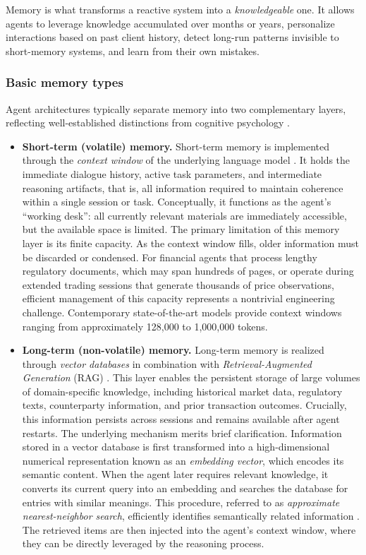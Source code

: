 \documentclass{article}
\begin{document}
Memory is what transforms a reactive system into a \textit{knowledgeable} one. It allows agents to leverage knowledge accumulated over months or years, personalize interactions based on past client history, detect long-run patterns invisible to short-memory systems, and learn from their own mistakes.

\subsubsection{Basic memory types}
Agent architectures typically separate memory into two complementary layers, reflecting well-established distinctions from cognitive psychology \cite{baddeley2025working}.

\begin{itemize}
    \item \textbf{Short-term (volatile) memory.}  Short-term memory is implemented through the \textit{context window} of the underlying language model \cite{brown2020language}. It holds the immediate dialogue history, active task parameters, and intermediate reasoning artifacts, that is, all information required to maintain coherence within a single session or task. Conceptually, it functions as the agent’s ``working desk'': all currently relevant materials are immediately accessible, but the available space is limited. The primary limitation of this memory layer is its finite capacity. As the context window fills, older information must be discarded or condensed. For financial agents that process lengthy regulatory documents, which may span hundreds of pages, or operate during extended trading sessions that generate thousands of price observations, efficient management of this capacity represents a nontrivial engineering challenge. Contemporary state-of-the-art models provide context windows ranging from approximately 128{,}000 to 1{,}000{,}000 tokens. 

    \item \textbf{Long-term (non-volatile) memory.}  Long-term memory is realized through \textit{vector databases} in combination with \textit{Retrieval-Augmented Generation} (RAG) \cite{lewis2020retrieval}. This layer enables the persistent storage of large volumes of domain-specific knowledge, including historical market data, regulatory texts, counterparty information, and prior transaction outcomes. Crucially, this information persists across sessions and remains available after agent restarts. The underlying mechanism merits brief clarification. Information stored in a vector database is first transformed into a high-dimensional numerical representation known as an \textit{embedding vector}, which encodes its semantic content. When the agent later requires relevant knowledge, it converts its current query into an embedding and searches the database for entries with similar meanings. This procedure, referred to as \textit{approximate nearest-neighbor search}, efficiently identifies semantically related information \cite{malkov2018efficient}. The retrieved items are then injected into the agent’s context window, where they can be directly leveraged by the reasoning process.
\end{itemize}
\end{document}
